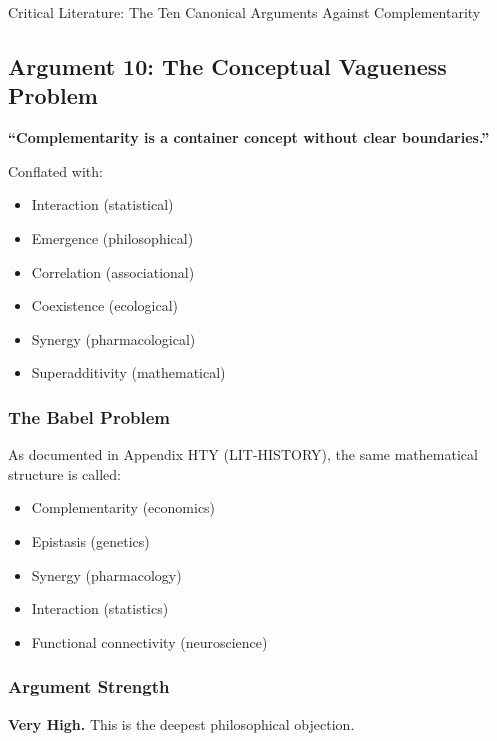 \begin{chapter}{Critical Literature: The Ten Canonical Arguments Against Complementarity}
\subsection{Argument 10: The Conceptual Vagueness Problem}
\label{sec:arg-vagueness}

\begin{tcolorbox}[colback=red!5!white,colframe=red!75!black,title=\textbf{Core Claim}]
\textbf{``Complementarity is a container concept without clear boundaries.''}

Conflated with:
\begin{itemize}[noitemsep]
    \item Interaction (statistical)
    \item Emergence (philosophical)
    \item Correlation (associational)
    \item Coexistence (ecological)
    \item Synergy (pharmacological)
    \item Superadditivity (mathematical)
\end{itemize}
\end{tcolorbox}

\subsubsection{The Babel Problem}

As documented in Appendix HTY (LIT-HISTORY), the same mathematical structure is called:
\begin{itemize}[noitemsep]
    \item Complementarity (economics)
    \item Epistasis (genetics)
    \item Synergy (pharmacology)
    \item Interaction (statistics)
    \item Functional connectivity (neuroscience)
\end{itemize}

\subsubsection{Argument Strength}

\textbf{Very High.} This is the deepest philosophical objection.


\end{chapter}
